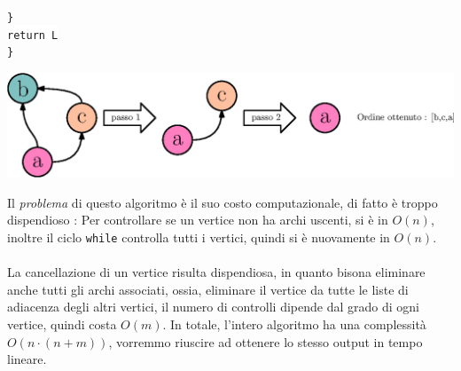 \documentclass[12pt, letterpaper]{article}
\newcommand{\code}[1]{\colorbox{light-gray}{\texttt{#1}}}
\newcommand{\codee}[1]{\colorbox{white}{\texttt{#1}}}
\newcommand{\acc}{\\\hphantom{}\\}
\begin{document}
\hphantom{ident}\codee{\}}\\
\hphantom{ident}\codee{return L}\\
\codee{\}}\begin{center}
    \includegraphics[width=1\textwidth ]{images/ordTopologico.eps}
    \end{center}
Il \textit{problema} di questo algoritmo è il suo costo computazionale, di fatto è troppo dispendioso : Per 
controllare se un vertice non ha archi uscenti, si è in \(O(n)\), inoltre il ciclo \code{while} controlla 
tutti i vertici, quindi si è nuovamente in \(O(n)\).    \acc  La cancellazione di un vertice risulta dispendiosa, in 
quanto bisona eliminare anche tutti gli archi associati, ossia, eliminare il vertice da tutte le liste 
di adiacenza degli altri vertici, il numero di controlli dipende dal grado di ogni vertice,
quindi costa \(O(m)\). In totale, l'intero algoritmo ha una complessità \(O(n\cdot(n+m))\), vorremmo riuscire 
ad ottenere lo stesso output in tempo lineare.
\end{document}
